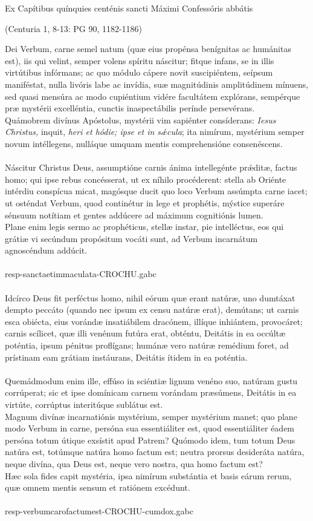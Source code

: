 \documentclass[options]{article}
\begin{document}
	Ex Capítibus quínquies centénis sancti Máximi Confessóris abbátis 
	\begin{flushright}	
	(Centuria 1, 8-13: PG 90, 1182-1186)	
	\end{flushright}
Dei Verbum, carne semel natum (quæ eius propénsa benígnitas ac humánitas est), iis qui velint, semper volens spíritu náscitur; fitque infans, se in illis virtútibus infórmans; ac quo módulo cápere novit suscipiéntem, seípsum maniféstat, nulla livóris labe ac invídia, suæ magnitúdinis amplitúdinem mínuens, sed quasi mensúra ac modo cupiéntium vidére facultátem explórans, sempérque præ mystérii excelléntia, cunctis inaspectábilis perínde persevérans.\\
Quámobrem divínus Apóstolus, mystérii vim sapiénter consíderans: \emph{Iesus Christus,} inquit, \emph{heri et hódie; ipse et in s\'{æ}cula}; ita nimírum, mystérium semper novum intéllegens, nulláque umquam mentis comprehensióne consenéscens.\\\\
Náscitur Christus Deus, assumptióne carnis ánima intellegénte pr\'{æ}ditæ, factus homo; qui ipse rebus concésserat, ut ex níhilo procéderent: stella ab Oriénte intérdiu conspícua micat, magósque ducit quo loco Verbum assúmpta carne iacet; ut osténdat Verbum, quod continétur in lege et prophétis, mýstice superáre sénsuum notítiam et gentes addúcere ad máximum cognitiónis lumen.\\
Plane enim legis sermo ac prophéticus, stellæ instar, pie intelléctus, eos qui grátiæ vi secúndum propósitum vocáti sunt, ad Verbum incarnátum agnoscéndum addúcit.\\
\\
resp-sanctaetimmaculata-CROCHU.gabc\\
\\
Idcírco Deus fit perféctus homo, nihil eórum quæ erant natúræ, uno dumtáxat dempto peccáto (quando nec ipsum ex censu natúræ erat), demútans; ut carnis esca obiécta, eius vorándæ insatiábilem dracónem, illíque inhiántem, provocáret; carnis scílicet, quæ illi venénum futúra erat, obténtu, Deitátis in ea occúltæ poténtia, ipsum pénitus proflígans; humánæ vero natúræ remédium foret, ad prístinam eam grátiam instáurans, Deitátis ítidem in ea poténtia.\\\\
Quemádmodum enim ille, effúso in sciéntiæ lignum venéno suo, natúram gustu corrúperat; sic et ipse domínicam carnem vorándam præsúmens, Deitátis in ea virtúte, corrúptus interitúque sublátus est.\\
Magnum divínæ incarnatiónis mystérium, semper mystérium manet; quo plane modo Verbum in carne, persóna sua essentiáliter est, quod essentiáliter éadem persóna totum útique exsístit apud Patrem? Quómodo idem, tum totum Deus natúra est, totúmque natúra homo factum est; neutra prorsus desideráta natúra, neque divína, qua Deus est, neque vero nostra, qua homo factum est?\\
Hæc sola fides capit mystéria, ipsa nimírum substántia et basis eárum rerum, quæ omnem mentis sensum et ratiónem excédunt.\\
\\
resp-verbumcarofactumest-CROCHU-cumdox.gabc
\end{document}
